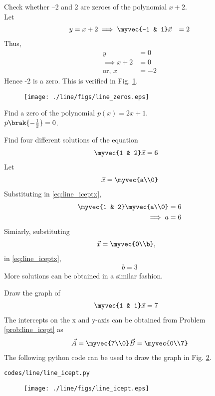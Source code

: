 \item Check whether –2 and 2 are zeroes of the polynomial $x + 2.$
\\
\solution Let 
%
\begin{align}
y &= x + 2
\implies \myvec{-1 & 1}\vec{x} &= 2
\end{align}
%
Thus, 
%
\begin{align}
y &= 0 
\\
\implies  x + 2 &=0
\\
\text{or, } x &= -2
\end{align}
%
Hence -2 is a zero. This is verified in Fig. \ref{fig:line_zeros}.
%
\begin{figure}[!ht]
\texttt{[image: ./line/figs/line\_zeros.eps]}
\caption{}
\label{fig:line_zeros}
\end{figure}
%
\item Find a zero of the polynomial $p(x) = 2x + 1$.
\\
\solution $p\brak{-\frac{1}{2}} = 0$.
%
%
\item Find four different solutions of the equation 
\label{prob:line_icept}
%
\begin{align}
\label{eq:line_iceptx}
\myvec{1 & 2}\vec{x} &= 6
\end{align}
%
\solution Let 
%
\begin{align}
\vec{x} = \myvec{a\\0}
\end{align}
%
Substituting in \eqref{eq:line_iceptx}, 
%
\begin{align}
\myvec{1 & 2} \myvec{a\\0}&= 6
\\
\implies a &=6
\end{align}
%
Simiarly, substituting 
%
\begin{align}
\vec{x} &= \myvec{0\\b},
\end{align}
%
in \eqref{eq:line_iceptx}, 
%
%
\begin{align}
b =3
\end{align}
%
More solutions can be obtained in a similar fashion.
%
\item Draw the graph of 
%
\begin{align}
\myvec{1 & 1}\vec{x} &= 7
\end{align}
%
\solution The intercepts on the x and y-axis can be obtained from Problem \ref{prob:line_icept}
as
%
\begin{align}
\vec{A} = \myvec{7\\0}
\vec{B} = \myvec{0\\7}
\end{align}
%
The following python code can be used to draw the graph in Fig. \ref{fig:line_icept}.
%
\begin{lstlisting}
codes/line/line_icept.py
\end{lstlisting}
%
\begin{figure}[!ht]
\texttt{[image: ./line/figs/line\_icept.eps]}
\caption{}
\label{fig:line_icept}
\end{figure}
%
%
%

%
%
%
%
%
